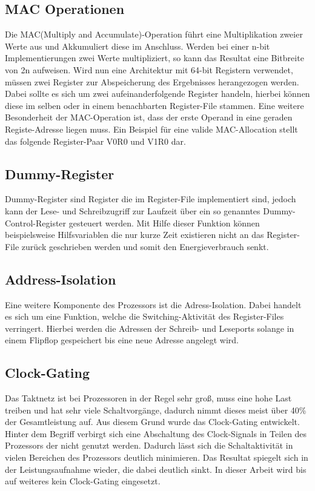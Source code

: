 \subsection{MAC Operationen}\label{subsec:macMode}
Die MAC(Multiply and Accumulate)-Operation führt eine Multiplikation zweier Werte aus und Akkumuliert diese im Anschluss. Werden bei einer n-bit Implementierungen zwei Werte multipliziert, so kann das Resultat eine Bitbreite von 2n aufweisen. Wird nun eine Architektur mit 64-bit Registern verwendet, müssen zwei Register zur Abspeicherung des Ergebnisses herangezogen werden. Dabei sollte es sich um zwei aufeinanderfolgende Register handeln, hierbei können diese im selben oder in einem benachbarten Register-File stammen. Eine weitere Besonderheit der MAC-Operation ist, dass der erste Operand in eine geraden Registe-Adresse liegen muss. Ein Beispiel für eine valide MAC-Allocation stellt das folgende Register-Paar V0R0 und V1R0 dar.
  

\subsection{Dummy-Register}\label{subsec:dummy}
Dummy-Register sind Register die im Register-File implementiert sind, jedoch kann der Lese- und Schreibzugriff zur Laufzeit über ein so genanntes Dummy-Control-Register gesteuert werden. Mit Hilfe dieser Funktion können beispielsweise Hilfsvariablen die nur kurze Zeit existieren nicht an das Register-File zurück geschrieben werden und somit den Energieverbrauch senkt. 

\subsection{Address-Isolation}\label{subsec:add_iso}
Eine weitere Komponente des Prozessors ist die Adress-Isolation. Dabei handelt es sich um eine Funktion, welche die Switching-Aktivität des Register-Files verringert. Hierbei werden die Adressen der Schreib- und Leseports solange in einem Flipflop gespeichert bis eine neue Adresse angelegt wird.\cite{lukasglitches2017}

\subsection{Clock-Gating}\label{subsec:clock-gate}
Das Taktnetz ist bei Prozessoren in der Regel sehr groß, muss eine hohe Last treiben und hat sehr viele Schaltvorgänge, dadurch nimmt dieses meist über 40\% der Gesamtleistung auf. Aus diesem Grund wurde das Clock-Gating entwickelt. Hinter dem Begriff verbirgt sich eine Abschaltung des Clock-Signals in Teilen des Prozessors der nicht genutzt werden. Dadurch lässt sich die Schaltaktivität in vielen Bereichen des Prozessors deutlich minimieren. Das Resultat spiegelt sich in der Leistungsaufnahme wieder, die dabei deutlich sinkt.\cite{donno2003clock} In dieser Arbeit wird bis auf weiteres kein Clock-Gating eingesetzt.

